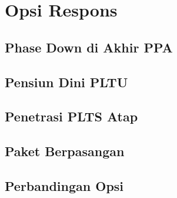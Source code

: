 \section{Opsi Respons}
\label{sec:opsi}

\subsection{Phase Down di Akhir PPA}

\subsection{Pensiun Dini PLTU}

\subsection{Penetrasi PLTS Atap}

\subsection{Paket Berpasangan}

\subsection{Perbandingan Opsi}
